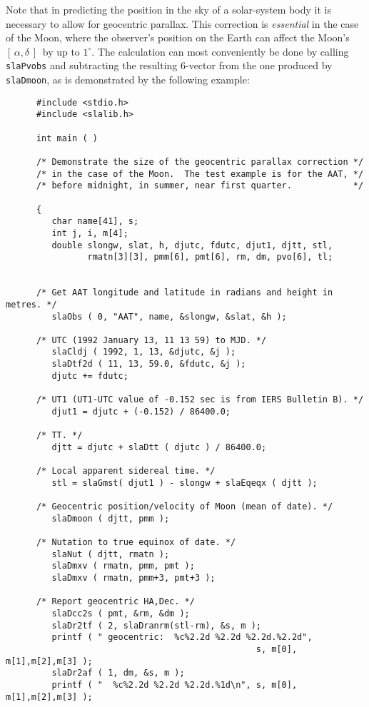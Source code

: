 \documentclass[11pt,fleqn,twoside]{article}
\renewcommand{\_}{{\tt\char'137}}     %
\newcommand{\radec}     {$[\,\alpha,\delta\,]$}
\begin{document}
Note that in predicting the position in the sky of a solar-system body
it is necessary to allow for geocentric parallax.  This correction
is {\it essential}\/ in the case of the Moon, where the observer's
position on the Earth can affect the Moon's \radec\ by up to
$1^\circ$.  The calculation can most conveniently be done by calling
{\tt slaPvobs} and subtracting the resulting 6-vector from the
one produced by
{\tt slaDmoon}, as is demonstrated by the following example:
\goodbreak
\vspace{-3ex}
\begin{verbatim}
      #include <stdio.h>
      #include <slalib.h>

      int main ( )

      /* Demonstrate the size of the geocentric parallax correction */
      /* in the case of the Moon.  The test example is for the AAT, */
      /* before midnight, in summer, near first quarter.            */

      {
         char name[41], s;
         int j, i, m[4];
         double slongw, slat, h, djutc, fdutc, djut1, djtt, stl,
                rmatn[3][3], pmm[6], pmt[6], rm, dm, pvo[6], tl;


      /* Get AAT longitude and latitude in radians and height in metres. */
         slaObs ( 0, "AAT", name, &slongw, &slat, &h );

      /* UTC (1992 January 13, 11 13 59) to MJD. */
         slaCldj ( 1992, 1, 13, &djutc, &j );
         slaDtf2d ( 11, 13, 59.0, &fdutc, &j );
         djutc += fdutc;

      /* UT1 (UT1-UTC value of -0.152 sec is from IERS Bulletin B). */
         djut1 = djutc + (-0.152) / 86400.0;

      /* TT. */
         djtt = djutc + slaDtt ( djutc ) / 86400.0;

      /* Local apparent sidereal time. */
         stl = slaGmst( djut1 ) - slongw + slaEqeqx ( djtt );

      /* Geocentric position/velocity of Moon (mean of date). */
         slaDmoon ( djtt, pmm );

      /* Nutation to true equinox of date. */
         slaNut ( djtt, rmatn );
         slaDmxv ( rmatn, pmm, pmt );
         slaDmxv ( rmatn, pmm+3, pmt+3 );

      /* Report geocentric HA,Dec. */
         slaDcc2s ( pmt, &rm, &dm );
         slaDr2tf ( 2, slaDranrm(stl-rm), &s, m );
         printf ( " geocentric:  %c%2.2d %2.2d %2.2d.%2.2d",
                                                 s, m[0], m[1],m[2],m[3] );
         slaDr2af ( 1, dm, &s, m );
         printf ( "  %c%2.2d %2.2d %2.2d.%1d\n", s, m[0], m[1],m[2],m[3] );


\end{verbatim}
\end{document}
